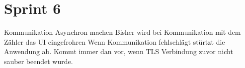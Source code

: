 \section{Sprint 6}





Kommunikation Asynchron machen
Bisher wird bei Kommunikation mit dem Zähler das UI eingefrohren
Wenn Kommunikation fehlschlägt stürtzt die Anwendung ab.
Kommt immer dan vor, wenn TLS Verbindung zuvor nicht sauber beendet wurde.